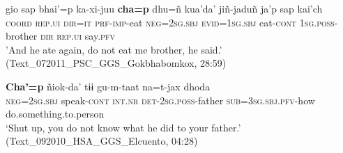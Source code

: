 \documentclass[output=paper]{langsci/langscibook}
\begin{document}
\begin{xlist}
\item\gll gio sap bhai’=p ka-xi-juu \textbf{cha=p} dhu=ñ kua’da’ jiñ-jaduñ ja’p sap kai’ch\\
\textsc{coord} \textsc{rep.ui} \textsc{dir=it} \textsc{prf-imp}-eat \textsc{neg=2sg.sbj} \textsc{evid=1sg.sbj} eat-\textsc{cont} \textsc{1sg.poss}-brother \textsc{dir} \textsc{rep.ui} say.\textsc{pfv}\\
\glt 'And he ate again, do not eat me brother, he said.’ (Text\_072011\_PSC\_GGS\_Gokbhabomkox, 28:59)
\item\gll \textbf{Cha’=p} ñiok-da’ tɨɨ gu-m-taat na=t-jax dhoda\\
\textsc{neg=2sg.sbj} speak-\textsc{cont} \textsc{int.nr} \textsc{det-2sg.poss}-father \textsc{sub=3sg.sbj.pfv}-how do.something.to.person\\
\glt ‘Shut up, you do not know what he did to your father.’ (Text\_092010\_HSA\_GGS\_Elcuento, 04:28)
\end{xlist}
\z
\end{document}
